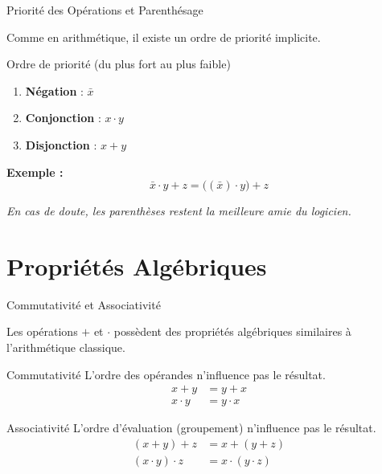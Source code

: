 \begin{frame}{Priorité des Opérations et Parenthésage}

    Comme en arithmétique, il existe un ordre de priorité implicite.

    \vspace{0.5cm}

    \begin{block}{Ordre de priorité (du plus fort au plus faible)}
        \begin{enumerate}
            \item \textbf{Négation} : \(\bar{x}\)
            \item \textbf{Conjonction} : \(x \cdot y\)
            \item \textbf{Disjonction} : \(x + y\)
        \end{enumerate}
    \end{block}

    \vspace{0.4cm}

    \textbf{Exemple :}
    \[
        \bar{x} \cdot y + z = \big((\bar{x}) \cdot y\big) + z
    \]

    \vspace{0.2cm}
    \centering
    \textit{En cas de doute, les parenthèses restent la meilleure amie du logicien.}

\end{frame}

\section{Propriétés Algébriques}

\begin{frame}{Commutativité et Associativité}

    Les opérations \(+\) et \(\cdot\) possèdent des propriétés algébriques similaires à l'arithmétique classique.

    \vspace{0.4cm}

    \begin{block}{Commutativité}
        L'ordre des opérandes n'influence pas le résultat.
        \begin{align*}
            x + y &= y + x \\
            x \cdot y &= y \cdot x
        \end{align*}
    \end{block}

    \begin{block}{Associativité}
        L'ordre d'évaluation (groupement) n'influence pas le résultat.
        \begin{align*}
            (x + y) + z &= x + (y + z) \\
            (x \cdot y) \cdot z &= x \cdot (y \cdot z)
        \end{align*}
    \end{block}

\end{frame}

